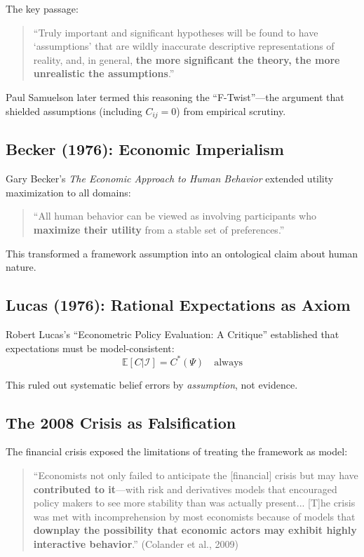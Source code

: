 \documentclass[12pt,a4paper]{article}
\begin{document}
The key passage:
\begin{quote}
``Truly important and significant hypotheses will be found to have `assumptions' that are wildly inaccurate descriptive representations of reality, and, in general, \textbf{the more significant the theory, the more unrealistic the assumptions}.''
\end{quote}

Paul Samuelson later termed this reasoning the ``F-Twist''---the argument that shielded assumptions (including $C_{ij} = 0$) from empirical scrutiny.

\subsection{Becker (1976): Economic Imperialism}

Gary Becker's \textit{The Economic Approach to Human Behavior} extended utility maximization to all domains:
\begin{quote}
``All human behavior can be viewed as involving participants who \textbf{maximize their utility} from a stable set of preferences.''
\end{quote}

This transformed a framework assumption into an ontological claim about human nature.

\subsection{Lucas (1976): Rational Expectations as Axiom}

Robert Lucas's ``Econometric Policy Evaluation: A Critique'' established that expectations must be model-consistent:
\begin{equation}
\mathbb{E}[C | \mathcal{I}] = C^*(\Psi) \quad \text{always}
\end{equation}

This ruled out systematic belief errors by \textit{assumption}, not evidence.

\subsection{The 2008 Crisis as Falsification}

The financial crisis exposed the limitations of treating the framework as model:

\begin{quote}
``Economists not only failed to anticipate the [financial] crisis but may have \textbf{contributed to it}---with risk and derivatives models that encouraged policy makers to see more stability than was actually present... [T]he crisis was met with incomprehension by most economists because of models that \textbf{downplay the possibility that economic actors may exhibit highly interactive behavior}.'' (Colander et al., 2009)
\end{quote}
\end{document}

